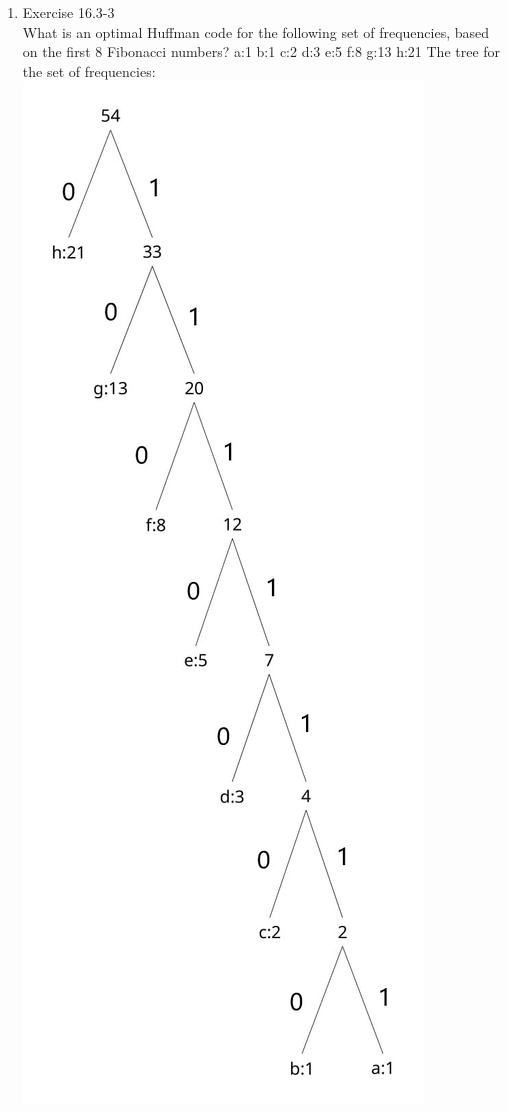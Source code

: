\documentclass[12pt]{article}
\begin{document}
\begin{enumerate}
\item Exercise 16.3-3 \\
What is an optimal Huffman code for the following set of frequencies, based on the first 8 Fibonacci numbers?  a:1 b:1 c:2 d:3 e:5 f:8 g:13 h:21
The tree for the set of frequencies:\\
\includegraphics[scale=.45]{54-2.jpg}\\

\end{enumerate}
\end{document}
